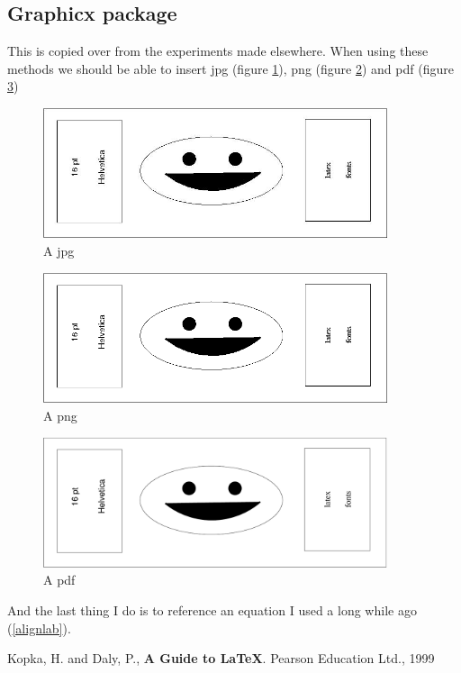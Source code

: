 \documentclass[12pt,a4paper]{article}
\renewcommand{\textit}{\textbf}
\newcommand{\nextalt}[1]{}
\theoremstyle{clearprint}
\begin{document}
\subsection[Graphicx]{Graphicx package}
\setcounter{equation}{0}

This is copied over from the experiments made elsewhere. When using these methods we should be able to insert jpg (figure \ref{jpg}), png (figure \ref{png}) and pdf (figure \ref{pdf})

\begin{figure}[!htbp]
\noindent
\nextalt{This is an alt text for the following image $4$!}
\includegraphics[width=0.9\textwidth]{smile.jpg}
\caption{A jpg}\label{jpg}
\end{figure}

\begin{figure}[!htbp]
\nextalt{This is an alt text for the following png image $4$!}
\includegraphics[width=0.9\textwidth]{smile.png}
\caption{A png}\label{png}
\end{figure}

\begin{figure}[!htbp]
\nextalt{This is an alt text for the following pdf image $4$!}
\includegraphics[width=0.9\textwidth]{smile.pdf}
\caption{A pdf}\label{pdf}
\end{figure}

And the last thing I do is to reference an equation I used a long while ago (\ref{alignlab}).

\clearpage

\begin{thebibliography}{99}
 Kopka, H. and Daly, P., \textit{A Guide to \LaTeX}. Pearson Education Ltd., 1999
\end{thebibliography}
\end{document}
